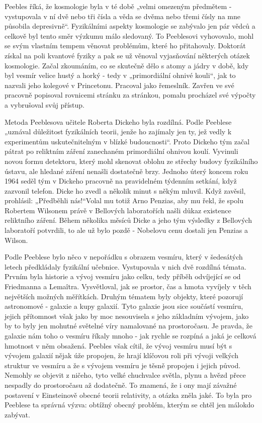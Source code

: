   Peebles říká, že kosmologie byla v té době „velmi omezeným předmětem - vystupovala v ní dvě nebo
  tři čísla a věda se dvěma nebo třemi čísly na mne působila depresivně“. Fyzikálními aspekty
  kosmologie se zabývalo jen pár vědců a celkově byl tento směr výzkumu málo sledovaný. To
  Peeblesovi vyhovovalo, mohl se svým vlastním tempem věnovat problémům, které ho přitahovaly.
  Doktorát získal na poli kvantové fyziky a pak se už věnoval vyjasňování některých otázek
  kosmologie. Začal zkoumáním, co se skutečně dělo s atomy a jádry v době, kdy byl vesmír velice
  hustý a horký - tedy v „primordiální ohnivé kouli“, jak to nazvali jeho kolegové v Princetonu.
  Pracoval jako řemeslník. Zavřen ve své pracovně popisoval rovnicemi stránku za stránkou, pomalu
  procházel své výpočty a vybrušoval svůj přístup. 
  
  Metoda Peeblesova učitele Roberta Dickeho byla rozdílná. Podle Peeblese „uznával důležitost
  fyzikálních teorii, jenže ho zajímaly jen ty, jež vedly k experimentům uskutečnitelným v blízké
  budoucnosti“. Proto Dickeho tým začal pátrat po reliktním záření zanechaném primordiální ohnivou
  koulí. Vyvinuli novou formu detektoru, který mohl skenovat oblohu ze střechy budovy fyzikálního
  ústavu, ale hledané záření nenašli dostatečně brzy. Jednoho úterý koncem roku 1964 seděl tým v
  Dickeho pracovně na pravidelném týdenním setkání, když zazvonil telefon. Dicke ho zvedl a několik
  minut s někým mluvil. Když zavěsil, prohlásil: „Předběhli nás!“Volal mu totiž Arno Penzias, aby mu
  řekl, že spolu Robertem Wilsonem právě v Bellových laboratořích našli důkaz existence reliktního
  záření. Během několika měsíců Dicke a jeho tým výsledky z Bellových laboratoří potvrdili, to ale
  už bylo pozdě - Nobelovu cenu dostali jen Penzias a Wilson. 
  
  Podle Peeblese bylo něco v nepořádku s obrazem vesmíru, který v šedesátých letech předkládaly
  fyzikální učebnice. Vystupovala v nich dvě rozdílná témata. Prvním byla historie a vývoj vesmíru
  jako celku, tedy příběh odvíjející se od Friedmanna a Lemaîtra. Vysvětloval, jak se prostor, čas a
  hmota vyvíjely v těch největších možných měřítkách. Druhým tématem byly objekty, které pozorují
  astronomové - galaxie a kupy galaxií. Tyto galaxie jsou sice součástí vesmíru, jejich přítomnost
  však jako by moc nesouvisela s jeho základním vývojem, jako by to byly jen mohutné světelné víry
  namalované na prostoročasu. Je pravda, že galaxie nám toho o vesmíru říkaly mnoho - jak rychle se
  rozpíná a jaká je celková hmotnost v něm obsažená. Peebles však cítil, že vývoj vesmíru musí být s
  vývojem galaxií nějak úže propojen, že hrají klíčovou roli při vývoji velkých struktur ve vesmíru
  a že s vývojem vesmíru je těsně propojen i jejich původ. Nemohly se objevit z ničeho, tyto velké
  chuchvalce světla, plynu a hvězd přece nespadly do prostoročasu až dodatečně. To znamená, že i ony
  mají závažné postavení v Einsteinově obecné teorii relativity, a otázka zněla jaké. To byla pro
  Peeblese ta správná výzva: obtížný obecný problém, kterým se chtěl jen málokdo zabývat. 
  
